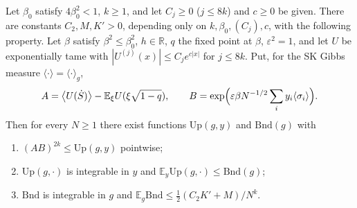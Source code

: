 \begin{lemma}
\label{lem:sg-tal:cor-kernel}
  \leanok
{}
Let $\beta_0$ satisfy $4\beta_0^2<1$, $k\ge1$, and let $C_j\ge0$ ($j\le8k$) and $c\ge0$ be given.  There are constants $C_2,M,K'>0$, depending only on $k,\beta_0,(C_j),c$, with the following property.  Let $\beta$ satisfy $\beta^2\le\beta_0^2$, $h\in\mathbb R$, $q$ the fixed point at $\beta$, $\varepsilon^2=1$, and let $U$ be exponentially tame with $|U^{(j)}(x)|\le C_je^{c|x|}$ for $j\le8k$.  Put, for the SK Gibbs measure $\langle\cdot\rangle=\langle\cdot\rangle_g$,
\[
A=\bigl\langle U(\dot S)\bigr\rangle-\mathbb E_\xi U(\xi\sqrt{1-q}),\qquad B=\exp\Bigl(\varepsilon\beta N^{-1/2}\sum_iy_i\langle\sigma_i\rangle\Bigr).
\]
Then for every $N\ge1$ there exist functions $\mathrm{Up}(g,y)$ and $\mathrm{Bnd}(g)$ with
\begin{enumerate}
\item $(AB)^{2k}\le\mathrm{Up}(g,y)$ pointwise;
\item $\mathrm{Up}(g,\cdot)$ is integrable in $y$ and $\mathbb E_y\mathrm{Up}(g,\cdot)\le\mathrm{Bnd}(g)$;
\item $\mathrm{Bnd}$ is integrable in $g$ and $\mathbb E_g\mathrm{Bnd}\le\frac12(C_2K'+M)/N^k$.
\end{enumerate}
\end{lemma}
